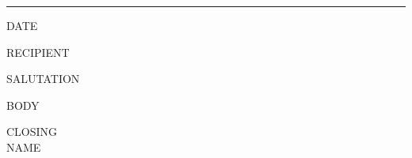 \vspace{4pt}
{\color{black}\rule{\textwidth}{0.4pt}}
\vspace{10pt}

\small

{{DATE}}

{{RECIPIENT}}

{{SALUTATION}}

{{BODY}}

{{CLOSING}}
\\
{{NAME}}


